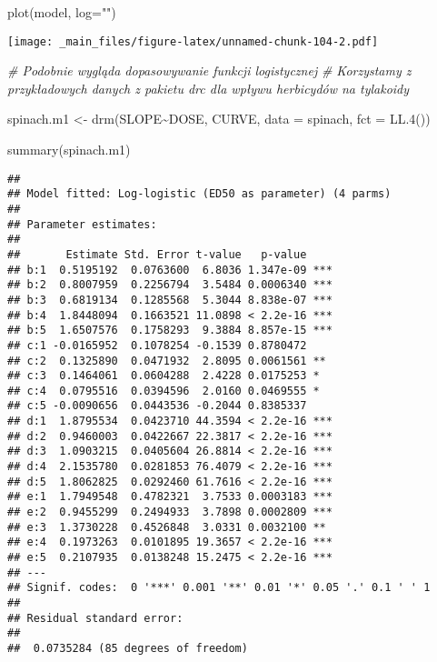 \documentclass[
]{book}
\newenvironment{Shaded}{\begin{snugshade}}{\end{snugshade}}
\newcommand{\AttributeTok}[1]{\textcolor[rgb]{0.77,0.63,0.00}{#1}}
\newcommand{\CommentTok}[1]{\textcolor[rgb]{0.56,0.35,0.01}{\textit{#1}}}
\newcommand{\FunctionTok}[1]{\textcolor[rgb]{0.00,0.00,0.00}{#1}}
\newcommand{\NormalTok}[1]{#1}
\newcommand{\OtherTok}[1]{\textcolor[rgb]{0.56,0.35,0.01}{#1}}
\newcommand{\SpecialCharTok}[1]{\textcolor[rgb]{0.00,0.00,0.00}{#1}}
\newcommand{\StringTok}[1]{\textcolor[rgb]{0.31,0.60,0.02}{#1}}
\begin{document}
\begin{Shaded}
\begin{Highlighting}[]
\FunctionTok{plot}\NormalTok{(model, }\AttributeTok{log=}\StringTok{""}\NormalTok{)}
\end{Highlighting}
\end{Shaded}

\texttt{[image: \_main\_files/figure-latex/unnamed-chunk-104-2.pdf]}

\begin{Shaded}
\begin{Highlighting}[]
\CommentTok{\# Podobnie wygląda dopasowywanie funkcji logistycznej}
\CommentTok{\# Korzystamy z przykładowych danych z pakietu drc dla wpływu herbicydów na tylakoidy}

\NormalTok{spinach.m1 }\OtherTok{\textless{}{-}} \FunctionTok{drm}\NormalTok{(SLOPE}\SpecialCharTok{\textasciitilde{}}\NormalTok{DOSE, CURVE, }\AttributeTok{data =}\NormalTok{ spinach, }\AttributeTok{fct =} \FunctionTok{LL.4}\NormalTok{())}

\FunctionTok{summary}\NormalTok{(spinach.m1)}
\end{Highlighting}
\end{Shaded}

\begin{verbatim}
## 
## Model fitted: Log-logistic (ED50 as parameter) (4 parms)
## 
## Parameter estimates:
## 
##       Estimate Std. Error t-value   p-value    
## b:1  0.5195192  0.0763600  6.8036 1.347e-09 ***
## b:2  0.8007959  0.2256794  3.5484 0.0006340 ***
## b:3  0.6819134  0.1285568  5.3044 8.838e-07 ***
## b:4  1.8448094  0.1663521 11.0898 < 2.2e-16 ***
## b:5  1.6507576  0.1758293  9.3884 8.857e-15 ***
## c:1 -0.0165952  0.1078254 -0.1539 0.8780472    
## c:2  0.1325890  0.0471932  2.8095 0.0061561 ** 
## c:3  0.1464061  0.0604288  2.4228 0.0175253 *  
## c:4  0.0795516  0.0394596  2.0160 0.0469555 *  
## c:5 -0.0090656  0.0443536 -0.2044 0.8385337    
## d:1  1.8795534  0.0423710 44.3594 < 2.2e-16 ***
## d:2  0.9460003  0.0422667 22.3817 < 2.2e-16 ***
## d:3  1.0903215  0.0405604 26.8814 < 2.2e-16 ***
## d:4  2.1535780  0.0281853 76.4079 < 2.2e-16 ***
## d:5  1.8062825  0.0292460 61.7616 < 2.2e-16 ***
## e:1  1.7949548  0.4782321  3.7533 0.0003183 ***
## e:2  0.9455299  0.2494933  3.7898 0.0002809 ***
## e:3  1.3730228  0.4526848  3.0331 0.0032100 ** 
## e:4  0.1973263  0.0101895 19.3657 < 2.2e-16 ***
## e:5  0.2107935  0.0138248 15.2475 < 2.2e-16 ***
## ---
## Signif. codes:  0 '***' 0.001 '**' 0.01 '*' 0.05 '.' 0.1 ' ' 1
## 
## Residual standard error:
## 
##  0.0735284 (85 degrees of freedom)
\end{verbatim}
\end{document}

